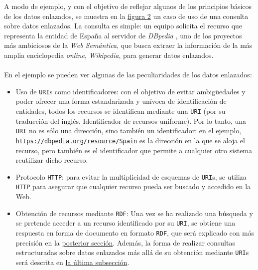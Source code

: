         \noindent A modo de ejemplo, y con el objetivo de reflejar algunos de los principios básicos de los datos enlazados, se muestra en la \hyperref[fig:linked]{figura 2} un caso de uso de una consulta sobre datos enlazados. La consulta es simple: un equipo solicita el recurso que representa la entidad de España al servidor de \textit{DBpedia} \cite{DBPEDIA}, uno de los proyectos más ambiciosos de la \textit{Web Semántica}, que busca extraer la información de la más amplia enciclopedia \textit{online}, \textit{Wikipedia}, para generar datos enlazados.
        \\ \\
        En el ejemplo se pueden ver algunas de las peculiaridades de los datos enlazados:
        \begin{itemize}
            \item Uso de \texttt{URI}s como identificadores: con el objetivo de evitar ambigüedades y poder ofrecer una forma estandarizada y unívoca de identificación de entidades, todos los recursos se identifican mediante una \texttt{URI} (por su traducción del inglés, Identificador de recursos uniforme). Por lo tanto, una \texttt{URI} no es sólo una dirección, sino también un identificador: en el ejemplo, \texttt{\url{https://dbpedia.org/resource/Spain}} es la dirección en la que se aloja el recurso, pero también es el identificador que permite a cualquier otro sistema reutilizar dicho recurso.
            \item Protocolo \texttt{HTTP}: para evitar la multiplicidad de esquemas de \texttt{URI}s, se utiliza \texttt{HTTP} para asegurar que cualquier recurso pueda ser buscado y accedido en la Web.
            \item Obtención de recursos mediante \texttt{RDF}: Una vez se ha realizado una búsqueda y se pretende acceder a un recurso identificado por su \texttt{URI}, se obtiene una respuesta en forma de documento en formato \texttt{RDF}, que será explicado con más precisión en la \hyperref[subsubsec:RDF]{posterior sección}. Además, la forma de realizar consultas estructuradas sobre datos enlazados más allá de su obtención mediante \texttt{URI}s será descrita en \hyperref[subsubsec:SPARQL]{la última subsección}.
        \end{itemize}
        
